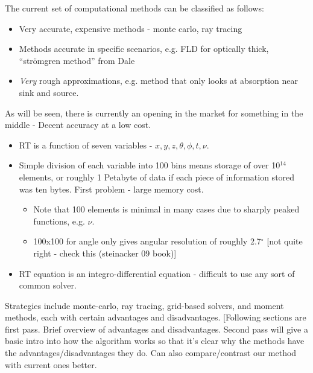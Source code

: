 The current set of computational methods can be classified as follows:

\begin{itemize}
\item Very accurate, expensive methods - monte carlo, ray tracing
\item Methods accurate in specific scenarios, e.g. FLD for optically thick, ``str\"omgren method'' from Dale
\item \emph{Very} rough approximations, e.g. method that only looks at absorption near sink and source.
\end{itemize}

As will be seen, there is currently an opening in the market for something in the middle - Decent accuracy at a low cost.


\begin{itemize}
\item RT is a function of seven variables - $x, y, z, \theta, \phi, t, \nu$.
\item Simple division of each variable into 100 bins means storage of over 10$^{14}$ elements, or roughly 1 Petabyte of data if each piece of information stored was ten bytes. First problem - large memory cost.
 \begin{itemize}
 \item Note that 100 elements is minimal in many cases due to sharply peaked functions, e.g. $\nu$.
 \item 100x100 for angle only gives angular resolution of roughly 2.7$^{\circ}$ [not quite right - check this (steinacker 09 book)] 
 \end{itemize}
\item RT equation is an integro-differential equation - difficult to use any sort of common solver.
\end{itemize}

Strategies include monte-carlo, ray tracing, grid-based solvers, and moment methods, each with certain advantages and disadvantages. [Following sections are first pass. Brief overview of advantages and disadvantages. Second pass will give a basic intro into how the algorithm works so that it's clear why the methods have the advantages/disadvantages they do. Can also compare/contrast our method with current ones better.

